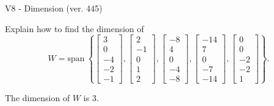\begin{exercise}
  \begin{exerciseTitle}V8 - Dimension (ver. 445)\end{exerciseTitle}
  \begin{exerciseStatement}
    Explain how to find the dimension of 
\[W=\mathrm{span}\ \left\{\left[\begin{array}{r}
3 \\
0 \\
-4 \\
-2 \\
-1
\end{array}\right] , \left[\begin{array}{r}
2 \\
-1 \\
0 \\
1 \\
2
\end{array}\right] , \left[\begin{array}{r}
-8 \\
4 \\
0 \\
-4 \\
-8
\end{array}\right] , \left[\begin{array}{r}
-14 \\
7 \\
0 \\
-7 \\
-14
\end{array}\right] , \left[\begin{array}{r}
0 \\
0 \\
-2 \\
-2 \\
1
\end{array}\right]\right\}.\]



  \end{exerciseStatement}
  \begin{exerciseAnswer}
   The dimension of \(W\) is  \(3\).
  


  \end{exerciseAnswer}
\end{exercise}